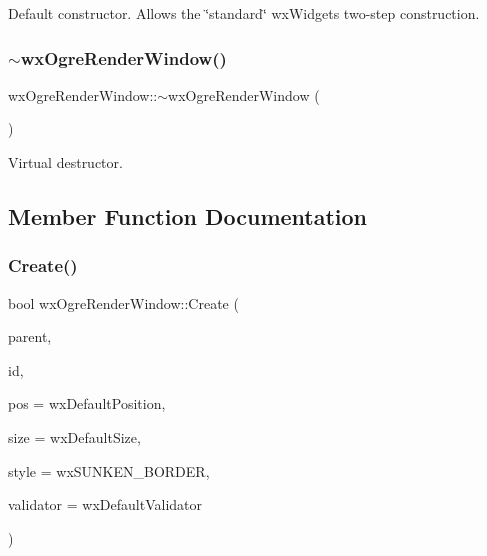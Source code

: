 Default constructor. Allows the \char`\"{}standard\char`\"{} wx\+Widgets\textquotesingle{} two-\/step construction. \mbox{\label{classwx_ogre_render_window_ab883308056ab07b1c21c583ddcde1a6e}} 
\subsubsection{\texorpdfstring{$\sim$wx\+Ogre\+Render\+Window()}{~wxOgreRenderWindow()}}
{\footnotesize\ttfamily wx\+Ogre\+Render\+Window\+::$\sim$wx\+Ogre\+Render\+Window (\begin{DoxyParamCaption}{ }\end{DoxyParamCaption})\hspace{0.3cm}{\ttfamily [virtual]}}

Virtual destructor. 

\subsection{Member Function Documentation}
\mbox{\label{classwx_ogre_render_window_addc8dc3f5edfffab2a52e222aab1e08b}} 
\subsubsection{\texorpdfstring{Create()}{Create()}}
{\footnotesize\ttfamily bool wx\+Ogre\+Render\+Window\+::\+Create (\begin{DoxyParamCaption}\item[{wx\+Window $\ast$}]{parent,  }\item[{wx\+Window\+ID}]{id,  }\item[{const wx\+Point \&}]{pos = {\ttfamily wxDefaultPosition},  }\item[{const wx\+Size \&}]{size = {\ttfamily wxDefaultSize},  }\item[{long}]{style = {\ttfamily wxSUNKEN\+\_\+BORDER},  }\item[{const wx\+Validator \&}]{validator = {\ttfamily wxDefaultValidator} }\end{DoxyParamCaption})}

